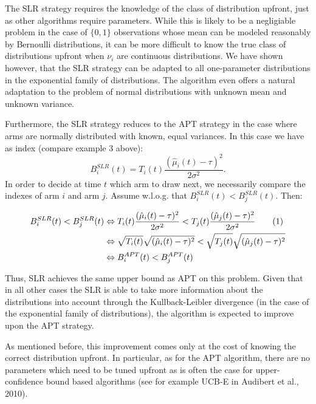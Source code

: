\documentclass[11pt,]{article}
\newcommand*{\Alignyesnumber}{\refstepcounter{equation}\tag{\theequation}}%
\begin{document}
The SLR strategy requires the knowledge of the class of distribution
upfront, just as other algorithms require parameters. While this is
likely to be a negligiable problem in the case of \(\{0,1\}\)
observations whose mean can be modeled reasonably by Bernoulli
distributions, it can be more difficult to know the true class of
distributions upfront when \(\nu_i\) are continuous distributions. We
have shown however, that the SLR strategy can be adapted to all
one-parameter distributions in the exponential family of distributions.
The algorithm even offers a natural adaptation to the problem of normal
distributions with unknown mean and unknown variance.

Furthermore, the SLR strategy reduces to the APT strategy in the case
where arms are normally distributed with known, equal variances. In this
case we have as index (compare example 3 above): \[
B_i^{SLR}(t) = T_i(t)\frac{(\hat{\mu}_i(t) - \tau)^2}{2\sigma^2}.
\] In order to decide at time \(t\) which arm to draw next, we
necessarily compare the indexes of arm \(i\) and arm \(j\). Assume
w.l.o.g. that \(B_i^{SLR}(t) < B_j^{SLR}(t)\). Then:

\begin{align*}
B_i^{SLR}(t) < B_j^{SLR}(t) & \Leftrightarrow 
T_i(t)\frac{(\hat{\mu}_i(t) - \tau)^2}{2\sigma^2} < T_j(t)\frac{(\hat{\mu}_j(t) - \tau)^2}{2\sigma^2} \Alignyesnumber\label{eqn:SLRWithKnownVar}\\
& \Leftrightarrow 
\sqrt{T_i(t)}\sqrt{(\hat{\mu}_i(t) - \tau)^2} < \sqrt{T_j(t)}\sqrt{(\hat{\mu}_j(t) - \tau)^2} \\
& \Leftrightarrow 
B_i^{APT}(t) < B_j^{APT}(t)
\end{align*}

Thus, SLR achieves the same upper bound as APT on this problem. Given
that in all other cases the SLR is able to take more information about
the distributions into account through the Kullback-Leibler divergence
(in the case of the exponential family of distributions), the algorithm
is expected to improve upon the APT strategy.

As mentioned before, this improvement comes only at the cost of knowing
the correct distribution upfront. In particular, as for the APT
algorithm, there are no parameters which need to be tuned upfront as is
often the case for upper-confidence bound based algorithms (see for
example UCB-E in Audibert et al., 2010).
\end{document}
